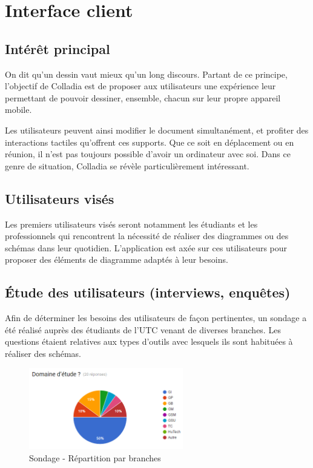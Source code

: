 \newpage
\section{Interface client}
\subsection{Intérêt principal}
On dit qu'un dessin vaut mieux qu'un long discours. Partant de ce principe, l'objectif de Colladia est de proposer aux utilisateurs une expérience leur permettant de pouvoir dessiner, ensemble, chacun sur leur propre appareil mobile. 

Les utilisateurs peuvent ainsi modifier le document simultanément, et profiter des interactions tactiles qu'offrent ces supports.
Que ce soit en déplacement ou en réunion, il n'est pas toujours possible d'avoir un ordinateur avec soi. Dans ce genre de situation, Colladia se révèle particulièrement intéressant.
 

\subsection{Utilisateurs visés}
Les premiers utilisateurs visés seront notamment les étudiants et les professionnels qui rencontrent la nécessité de réaliser des diagrammes ou des schémas dans leur quotidien.
L'application est axée sur ces utilisateurs pour proposer des éléments de diagramme adaptés à leur besoins.

\subsection{Étude des utilisateurs (interviews, enquêtes)}

Afin de déterminer les besoins des utilisateurs de façon pertinentes, un sondage a été réalisé auprès des étudiants de l’UTC venant de diverses branches. Les questions étaient relatives aux types d'outils avec lesquels ils sont habituées à réaliser des schémas. 


\begin{figure}[!h]
	\centering
	\includegraphics[width=0.6\textwidth]{img/sondage_branche}
	\caption{Sondage - Répartition par branches}
\end{figure}

